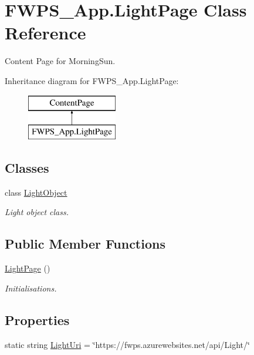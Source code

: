 \hypertarget{class_f_w_p_s___app_1_1_light_page}{}\section{F\+W\+P\+S\+\_\+\+App.\+Light\+Page Class Reference}
\label{class_f_w_p_s___app_1_1_light_page}


Content Page for Morning\+Sun.  


Inheritance diagram for F\+W\+P\+S\+\_\+\+App.\+Light\+Page\+:\begin{figure}[H]
\begin{center}
\leavevmode
\includegraphics[height=2.000000cm]{class_f_w_p_s___app_1_1_light_page}
\end{center}
\end{figure}
\subsection*{Classes}
\begin{DoxyCompactItemize}
\item 
class \mbox{\hyperlink{class_f_w_p_s___app_1_1_light_page_1_1_light_object}{Light\+Object}}
\begin{DoxyCompactList}\small\item\em Light object class. \end{DoxyCompactList}\end{DoxyCompactItemize}
\subsection*{Public Member Functions}
\begin{DoxyCompactItemize}
\item 
\mbox{\hyperlink{class_f_w_p_s___app_1_1_light_page_aa1c460a8fc9fc56ef888ea677b255ee9}{Light\+Page}} ()
\begin{DoxyCompactList}\small\item\em Initialisations. \end{DoxyCompactList}\end{DoxyCompactItemize}
\subsection*{Properties}
\begin{DoxyCompactItemize}
\item 
static string \mbox{\hyperlink{class_f_w_p_s___app_1_1_light_page_a716a9e5c26501a8180dddc358f418330}{Light\+Uri}} = \char`\"{}https\+://fwps.\+azurewebsites.\+net/api/Light/\char`\"{}
\end{DoxyCompactItemize}
